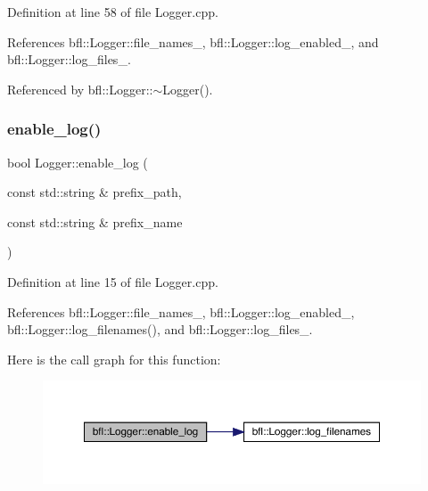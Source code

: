 Definition at line 58 of file Logger.\+cpp.



References bfl\+::\+Logger\+::file\+\_\+names\+\_\+, bfl\+::\+Logger\+::log\+\_\+enabled\+\_\+, and bfl\+::\+Logger\+::log\+\_\+files\+\_\+.



Referenced by bfl\+::\+Logger\+::$\sim$\+Logger().

\mbox{\label{classbfl_1_1Logger_ae94b97b6e8d7902e8ce048384813122e}} 
\subsubsection{\texorpdfstring{enable\+\_\+log()}{enable\_log()}}
{\footnotesize\ttfamily bool Logger\+::enable\+\_\+log (\begin{DoxyParamCaption}\item[{const std\+::string \&}]{prefix\+\_\+path,  }\item[{const std\+::string \&}]{prefix\+\_\+name }\end{DoxyParamCaption})\hspace{0.3cm}{\ttfamily [inherited]}}



Definition at line 15 of file Logger.\+cpp.



References bfl\+::\+Logger\+::file\+\_\+names\+\_\+, bfl\+::\+Logger\+::log\+\_\+enabled\+\_\+, bfl\+::\+Logger\+::log\+\_\+filenames(), and bfl\+::\+Logger\+::log\+\_\+files\+\_\+.

Here is the call graph for this function\+:
\nopagebreak
\begin{figure}[H]
\begin{center}
\leavevmode
\includegraphics[width=350pt]{classbfl_1_1Logger_ae94b97b6e8d7902e8ce048384813122e_cgraph}
\end{center}
\end{figure}
\mbox{\label{classbfl_1_1MeasurementModel_a67ef096c5b3682252582aec75498089d}} 
